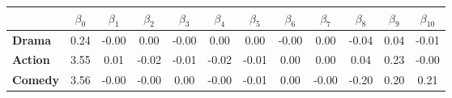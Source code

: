 \begin{tabular}{|l|c|c|c|c|c|c|c|c|c|c|c|}
\hline
&\textbf{$\beta_{0}$}&\textbf{$\beta_{1}$}&\textbf{$\beta_{2}$}&\textbf{$\beta_{3}$}&\textbf{$\beta_{4}$}&\textbf{$\beta_{5}$}&\textbf{$\beta_{6}$}&\textbf{$\beta_{7}$}&\textbf{$\beta_{8}$}&\textbf{$\beta_{9}$}&\textbf{$\beta_{10}$}\\\hline
\textbf{Drama}&0.24&-0.00&0.00&-0.00&0.00&0.00&-0.00&0.00&-0.04&0.04&-0.01\\\hline
\textbf{Action}&3.55&0.01&-0.02&-0.01&-0.02&-0.01&0.00&0.00&0.04&0.23&-0.00\\\hline
\textbf{Comedy}&3.56&-0.00&-0.00&0.00&-0.00&-0.01&0.00&-0.00&-0.20&0.20&0.21\\\hline
\end{tabular}
